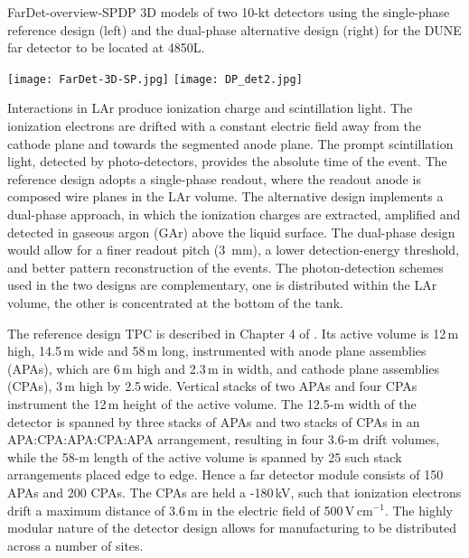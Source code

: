 \begin{cdrfigure}{FarDet-overview-SPDP}
{3D models of two 10-kt detectors using the single-phase reference design (left) 
and the dual-phase alternative design (right) for the DUNE far detector to be 
located at 4850L.}
\centering
\begin{minipage}[b]{1.0\textwidth}
\begin{center}
\texttt{[image: FarDet-3D-SP.jpg]}
\texttt{[image: DP\_det2.jpg]}
\end{center}
\end{minipage}
\end{cdrfigure}


Interactions in LAr produce ionization charge and scintillation light.
The ionization electrons are drifted with a constant electric field away from the cathode
plane and towards the segmented anode plane. 
The prompt scintillation light,
detected by photo-detectors, provides the absolute time of the event.
The reference design adopts a single-phase readout, where the readout anode is composed wire planes in the LAr volume. 
The alternative design implements a  dual-phase approach, in which the 
ionization charges are extracted, amplified and detected in gaseous argon (GAr) above the liquid surface. 
The dual-phase design would allow for a finer readout pitch (3~mm), 
a lower detection-energy threshold, and better pattern reconstruction of the events.
The photon-detection schemes used in the two designs are complementary, one is distributed
within the LAr volume, the other is concentrated at the bottom of the tank.

The  reference design TPC is described in Chapter 4 of \voldune. 
Its active volume is 12\,m high, 14.5\,m wide and 
58\,m long, instrumented with anode plane assemblies (APAs), 
which are 6\,m high and 2.3\,m in width, and cathode plane assemblies (CPAs), 3\,m high by 2.5\,wide. Vertical stacks of
two APAs and four CPAs %
instrument the 12\,m height of the active volume. The 12.5-m width of the detector is 
spanned by three stacks of APAs and two stacks of CPAs in an APA:CPA:APA:CPA:APA
arrangement, resulting in four 3.6-m drift volumes, while the 58-m length of the active volume
is spanned by 25 such stack arrangements placed edge to edge. Hence a  
far detector module consists of 150 APAs and 200 CPAs. The CPAs are held a -180\,kV, such that 
ionization electrons drift a maximum distance of 3.6\,m in the electric field of 500\,V\,cm$^{-1}$.
The highly modular nature of the detector design allows for manufacturing to be distributed across a number of sites.

